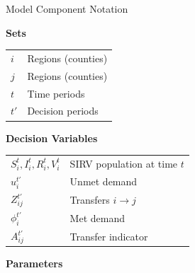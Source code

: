 \documentclass[aspectratio=169,xcolor=dvipsnames]{beamer}
\begin{document}
\begin{frame}{Model Component Notation}
    \small
    \begin{minipage}[t]{0.48\textwidth}
        \textbf{Sets} \vspace{1mm}

        \renewcommand{\arraystretch}{1.1}
        \begin{tabular}{|p{}|p{}|}
            \hline
            $i$ & Regions (counties) \\
            $j$ & Regions (counties) \\
            $t$ & Time periods \\
            $t'$ & Decision periods \\
            \hline
        \end{tabular}
        
        \vspace{5mm}

        \textbf{Decision Variables} \vspace{1mm}

        \begin{tabular}{|p{}|p{}|}
            \hline
            $S_i^t, I_i^t, R_i^t, V_i^t$ & SIRV population at time $t$ \\
            $u_i^{t'}$ & Unmet demand \\
            $Z_{ij}^{t'}$ & Transfers $i \to j$ \\
            $\phi_i^{t'}$ & Met demand \\
            $A_{ij}^{t'}$ & Transfer indicator \\
            \hline
        \end{tabular}
    \end{minipage}
    \hfill
    \begin{minipage}[t]{0.48\textwidth}
        \textbf{Parameters} \vspace{1mm}


\end{minipage}
\end{frame}
\end{document}
